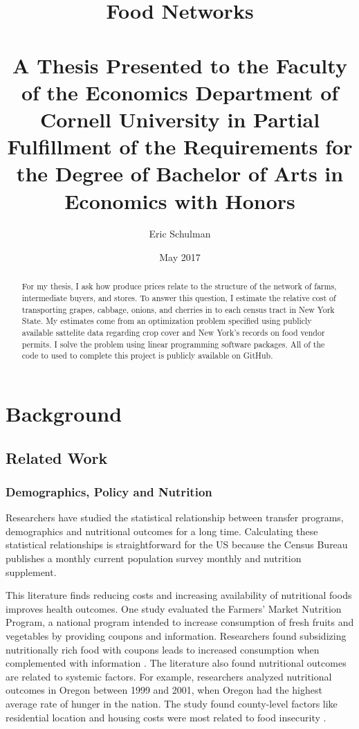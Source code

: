 \documentclass{report}
\title{Food Networks \\~\\ \normalsize A Thesis Presented to the Faculty of the Economics Department of Cornell University in Partial Fulfillment of the Requirements for the Degree of Bachelor of Arts in Economics with Honors}
\author{Eric Schulman}
\date{May 2017}
\begin{document}
\maketitle

\tableofcontents

\pagebreak

\begin{abstract}
For my thesis, I ask how produce prices relate to the structure of the network of farms, intermediate buyers, and stores. To answer this question, I estimate the relative cost of transporting grapes, cabbage, onions, and cherries in to each census tract in New York State. My estimates come from an optimization problem specified using publicly available sattelite data regarding crop cover and New York's records on food vendor permits. I solve the problem using linear programming software packages. All of the code to used to complete this project is publicly available on GitHub.

\end{abstract}

\chapter{Background}

\section{Related Work}

\subsection{Demographics, Policy and Nutrition}

Researchers have studied the statistical relationship between transfer programs, demographics and nutritional outcomes for a long time. Calculating these statistical relationships is straightforward for the US because the Census Bureau publishes a monthly current population survey monthly and nutrition supplement. 

This literature finds reducing costs and increasing availability of nutritional foods improves health outcomes. One study evaluated the Farmers' Market Nutrition Program, a national program intended to increase consumption of fresh fruits and vegetables by providing coupons and information. Researchers found subsidizing nutritionally rich food with coupons leads to increased consumption when complemented with information \cite{Just}. The literature also found nutritional outcomes are related to systemic factors. For example, researchers analyzed nutritional outcomes in Oregon between 1999 and 2001, when Oregon had the highest average rate of hunger in the nation. The study found county-level factors like residential location and housing costs were most related to food insecurity \cite{Bernell}. 
\end{document}

